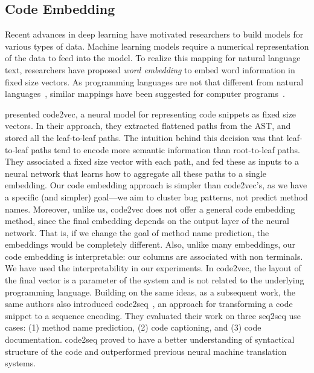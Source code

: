 \subsection{Code Embedding}

Recent advances in deep learning have motivated researchers to build models for various types of data. Machine learning models require a numerical representation of the data to feed into the model. To realize this mapping for natural language text, researchers have proposed \emph{word embedding} to embed word information in fixed size vectors. As programming languages are not that different from natural languages~\citep{hindle2016naturalness}, similar mappings have been suggested for computer programs~\citep{chen2019literature}.

\cite{alon2019code2vec} presented code2vec, a neural model for representing code snippets as fixed size vectors. In their approach, they extracted flattened paths from the AST, and stored all the leaf-to-leaf paths. The intuition behind this decision was that leaf-to-leaf paths tend to encode more semantic information than root-to-leaf paths. They associated a fixed size vector with each path, and fed these as inputs to a neural network that learns how to aggregate all these paths to a single embedding. Our code embedding approach is simpler than code2vec's, as we have a specific (and simpler) goal---we aim to cluster bug patterns, not predict method names. Moreover, unlike us, code2vec does not offer a general code embedding method, since the final embedding depends on the output layer of the neural network. That is, if we change the goal of method name prediction, the embeddings would be completely different. Also, unlike many embeddings, our code embedding is interpretable: our columns are associated with non terminals. We have used the interpretability in our experiments. In code2vec, the layout of the final vector is a parameter of the system and  is not related to the underlying programming language. Building on the same ideas, as a subsequent work, the same authors also introduced code2seq~\citep{alon2019code2seq}, an approach for transforming a code snippet to a sequence encoding. They evaluated their work on three seq2seq use cases: (1) method name prediction, (2) code captioning, and (3) code documentation. code2seq proved to have a better understanding of syntactical structure of the code and outperformed previous neural machine translation systems.

